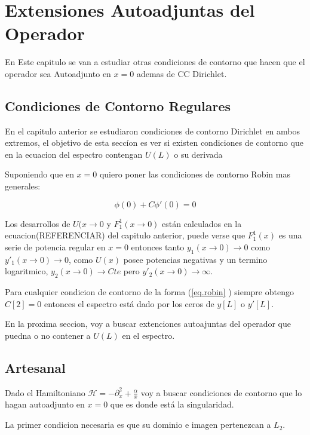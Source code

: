 \chapter{Extensiones Autoadjuntas del Operador}

    En Este capitulo se van a estudiar otras condiciones de contorno que hacen que el operador sea Autoadjunto en $x=0$ ademas de CC Dirichlet.

\section{Condiciones de Contorno Regulares}

En el capitulo anterior se estudiaron condiciones de contorno Dirichlet en ambos extremos, el objetivo de esta seccíon es ver si existen condiciones de contorno que en la ecuacion del espectro contengan $U(L)$ o su derivada

Suponiendo que en $x=0$ quiero poner las condiciones de contorno Robin mas generales:

\begin{equation}
\phi (0) + C \phi'(0) = 0 
\label{eq.robin}
\end{equation}

Los desarrollos de $U(x \rightarrow 0$ y $ F _1 ^1 (x \rightarrow 0 )$ están calculados en la ecuacion(REFERENCIAR) del capitulo anterior, puede verse que $F _1 ^1 (x)$ es una serie de potencia regular en $x=0$ entonces tanto $y_1 (x \rightarrow 0 ) \rightarrow 0$ como $y' _1 (x \rightarrow 0 ) \rightarrow 0$, como $U(x)$ posee potencias negativas y un termino logaritmico, $y _2 (x \rightarrow 0 ) \rightarrow Cte$ pero  $y' _2 (x \rightarrow 0 ) \rightarrow \infty $.

Para cualquier condicion de contorno de la forma (\ref{eq.robin} ) siempre obtengo $C[2] = 0$ entonces el espectro está dado por los ceros de $y[L]$ o $y'[L]$.


En la proxima seccion, voy a buscar extenciones autoajuntas del operador que puedna o no contener a $U(L)$ en el espectro.


\section{Artesanal}

Dado el Hamiltoniano $\mathscr{H} = - \partial ^2 _x + \frac{\alpha}{x}  $ voy a buscar condiciones de contorno que lo hagan autoadjunto en $x=0$ que es donde está la singularidad. 

La primer condicion necesaria es que su dominio e imagen pertenezcan a $L _2$.


